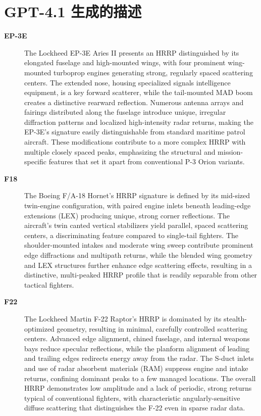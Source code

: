\section{GPT-4.1 生成的描述}
\label{sec:gpt41_desc}
\footnotesize
{\begin{description}
    \item[\textbf{EP-3E}]
    The Lockheed EP-3E Aries II presents an HRRP distinguished by its elongated fuselage and high-mounted wings, with four prominent wing-mounted turboprop engines generating strong, regularly spaced scattering centers. The extended nose, housing specialized signals intelligence equipment, is a key forward scatterer, while the tail-mounted MAD boom creates a distinctive rearward reflection. Numerous antenna arrays and fairings distributed along the fuselage introduce unique, irregular diffraction patterns and localized high-intensity radar returns, making the EP-3E's signature easily distinguishable from standard maritime patrol aircraft. These modifications contribute to a more complex HRRP with multiple closely spaced peaks, emphasizing the structural and mission-specific features that set it apart from conventional P-3 Orion variants.

    \item[\textbf{F18}]
    The Boeing F/A-18 Hornet's HRRP signature is defined by its mid-sized twin-engine configuration, with paired engine inlets beneath leading-edge extensions (LEX) producing unique, strong corner reflections. The aircraft's twin canted vertical stabilizers yield parallel, spaced scattering centers, a discriminating feature compared to single-tail fighters. The shoulder-mounted intakes and moderate wing sweep contribute prominent edge diffractions and multipath returns, while the blended wing geometry and LEX structures further enhance edge scattering effects, resulting in a distinctive, multi-peaked HRRP profile that is readily separable from other tactical fighters.

    \item[\textbf{F22}]
    The Lockheed Martin F-22 Raptor's HRRP is dominated by its stealth-optimized geometry, resulting in minimal, carefully controlled scattering centers. Advanced edge alignment, chined fuselage, and internal weapons bays reduce specular reflections, while the planform alignment of leading and trailing edges redirects energy away from the radar. The S-duct inlets and use of radar absorbent materials (RAM) suppress engine and intake returns, confining dominant peaks to a few managed locations. The overall HRRP demonstrates low amplitude and a lack of periodic, strong returns typical of conventional fighters, with characteristic angularly-sensitive diffuse scattering that distinguishes the F-22 even in sparse radar data.


\end{description}}
